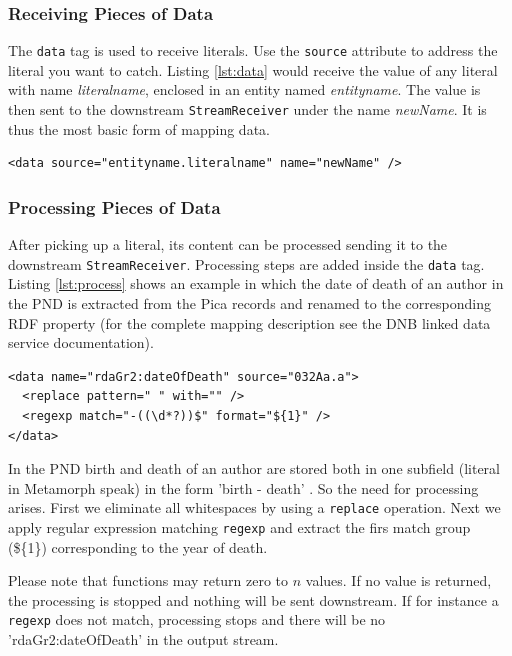 \documentclass[12pt,a4paper]{article}
\begin{document}
\subsubsection{Receiving Pieces of Data}\label{data}

The {\tt data} tag is used to receive literals. Use the {\tt source} attribute to address the literal you want to catch. Listing \ref{lst:data} would receive the value of any literal with name {\it literalname}, enclosed in an entity named {\it entityname}.
The value is then sent to the downstream {\tt StreamReceiver} under the name {\it newName}. It is thus the most basic form of mapping data.
\begin{lstlisting}[float=htb, label=lst:data,caption=Receiving values from literals]
<data source="entityname.literalname" name="newName" />
\end{lstlisting}


\subsubsection{Processing Pieces of Data}\label{process}
After picking up a literal, its content can be processed sending it to the downstream {\tt StreamReceiver}.
Processing steps are added inside the {\tt data} tag. Listing \ref{lst:process} shows an example in which the date of death of an author in the PND is extracted from the Pica records and renamed to the corresponding RDF property (for the complete mapping description see the DNB linked data service documentation).
\begin{lstlisting}[float=htb, label=lst:process,caption=Processing data within the {\tt data} tag]
<data name="rdaGr2:dateOfDeath" source="032Aa.a">
  <replace pattern=" " with="" />
  <regexp match="-((\d*?))$" format="${1}" />
</data>
\end{lstlisting}

In the PND birth and death of an author are stored both in one subfield (literal in Metamorph speak) in the form 'birth - death' . So the need for processing arises.
First we eliminate all whitespaces by using a {\tt replace} operation. Next we apply regular expression matching {\tt regexp} and extract the firs match group ({\$\{1\}}) corresponding to the year of death.

Please note that functions may return zero to $n$ values. If no value is returned, the processing is stopped and nothing will be sent downstream. If for instance a {\tt regexp} does not match, processing stops and there will be no 'rdaGr2:dateOfDeath' in the output stream.
\end{document}
